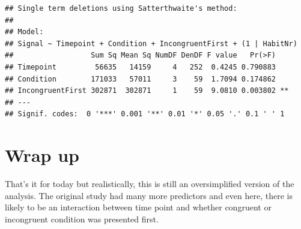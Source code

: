 \documentclass[
]{book}
\begin{document}
\begin{verbatim}
## Single term deletions using Satterthwaite's method:
## 
## Model:
## Signal ~ Timepoint + Condition + IncongruentFirst + (1 | HabitNr)
##                  Sum Sq Mean Sq NumDF DenDF F value   Pr(>F)   
## Timepoint         56635   14159     4   252  0.4245 0.790883   
## Condition        171033   57011     3    59  1.7094 0.174862   
## IncongruentFirst 302871  302871     1    59  9.0810 0.003802 **
## ---
## Signif. codes:  0 '***' 0.001 '**' 0.01 '*' 0.05 '.' 0.1 ' ' 1
\end{verbatim}

\hypertarget{wrap-up-2}{%
\section{Wrap up}\label{wrap-up-2}}

That's it for today but realistically, this is still an oversimplified version of the analysis. The original study had many more predictors and even here, there is likely to be an interaction between time point and whether congruent or incongruent condition was presented first.

  
\end{document}
